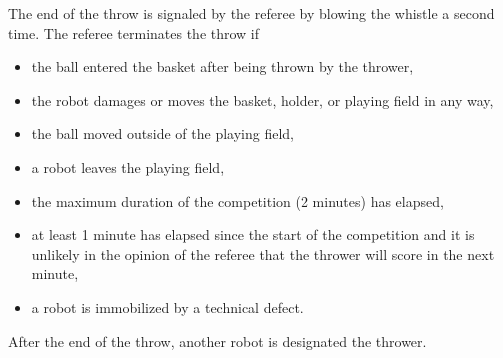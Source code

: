 \documentclass[12pt]{hurocup}
\begin{document}
\begin{lawlist}[BB]
\item The end of the throw is signaled by the referee by
  blowing the whistle a second time.
  The referee terminates the throw if
  \begin{itemize}
  \item the ball entered the basket after being thrown by the thrower,
  \item the robot damages or moves the basket, holder, or playing
    field in any way,
  \item the ball moved outside of the playing field,
  \item a robot leaves the playing field,
  \item the maximum duration of the competition (2 minutes) has elapsed,
  \item at least 1 minute has elapsed since the start of the
    competition and it is unlikely in the opinion of the referee that
    the thrower will score in the next minute,
  \item a robot is immobilized by a technical defect.
  \end{itemize}

\item After the end of the throw, another robot is designated the
 thrower. 

\end{lawlist}

\label{basketball-scoring}
\end{document}
